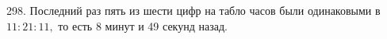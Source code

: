 298. Последний раз пять из шести цифр на табло часов были одинаковыми в $11:21:11,$ то есть 8 минут и 49 секунд назад.\\
